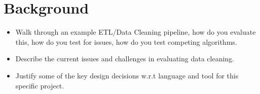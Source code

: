 \section{Background}

\begin{itemize}
    \item Walk through an example ETL/Data Cleaning pipeline, how do you evaluate this, how do you test for issues, how do you test competing algorithms.
    \item Describe the current issues and challenges in evaluating data cleaning.
    \item Justify some of the key design decisions w.r.t language and tool for this specific project.
\end{itemize}